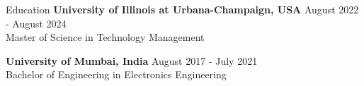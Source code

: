 \documentclass{resume} %
\begin{document}
\begin{rSection}{Education}
                        \textbf{University of Illinois at Urbana{-}Champaign, USA} \hfill {August 2022 - August 2024} \\
                            {Master of Science in Technology Management}
                         
             
         
                        \textbf{University of Mumbai, India} \hfill {August 2017 - July 2021} \\
                            {Bachelor of Engineering in Electronics Engineering}
                         
             
         
    \end{rSection}
\end{document}
